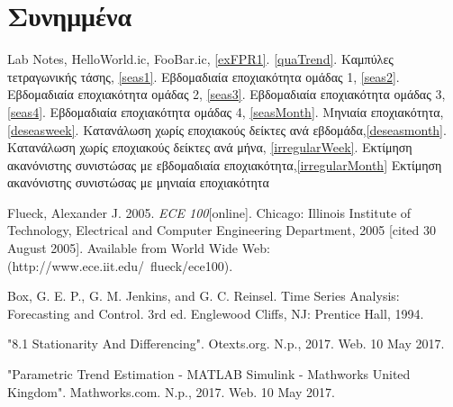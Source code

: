 \documentclass[a4paper, 11pt]{article}
\begin{document}
\section*{Συνημμένα}
\ifx
Lab Notes, HelloWorld.ic, FooBar.ic,
\ref{exFPR1}.
\fi %
\ref{quaTrend}. Καμπύλες τετραγωνικής τάσης, \ref{seas1}. Εβδομαδιαία εποχιακότητα ομάδας 1, \ref{seas2}. Εβδομαδιαία εποχιακότητα ομάδας 2, \ref{seas3}. Εβδομαδιαία εποχιακότητα ομάδας 3, \ref{seas4}. Εβδομαδιαία εποχιακότητα ομάδας 4, \ref{seasMonth}. Μηνιαία εποχιακότητα,  \ref{deseasweek}. Κατανάλωση χωρίς εποχιακούς δείκτες ανά εβδομάδα,\ref{deseasmonth}. Κατανάλωση χωρίς εποχιακούς δείκτες ανά μήνα, \ref{irregularWeek}. Εκτίμηση ακανόνιστης συνιστώσας με εβδομαδιαία εποχιακότητα,\ref{irregularMonth} Εκτίμηση ακανόνιστης συνιστώσας με μηνιαία εποχιακότητα
\begin{thebibliography}{9}
\ifx
{}  Flueck, Alexander J. 2005. \emph{ECE 100}[online]. Chicago: Illinois Institute of Technology, Electrical and Computer Engineering Department, 2005 [cited 30
August 2005]. Available from World Wide Web: (http://www.ece.iit.edu/~flueck/ece100).
\fi

 Box, G. E. P., G. M. Jenkins, and G. C. Reinsel. Time Series Analysis: Forecasting and Control. 3rd ed. Englewood Cliffs, NJ: Prentice Hall, 1994.

 "8.1 Stationarity And Differencing". Otexts.org. N.p., 2017. Web. 10 May 2017.

 "Parametric Trend Estimation - MATLAB Simulink - Mathworks United Kingdom". Mathworks.com. N.p., 2017. Web. 10 May 2017.
\end{thebibliography}
\end{document}
